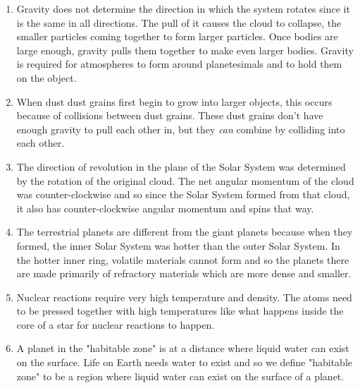 \documentclass[../hw2.tex]{subfiles}
\begin{document}

    \begin{enumerate}
        \item {} Gravity does not determine the direction in which the system rotates since it is the same in all directions. The pull of it causes the cloud to collapse, the smaller particles coming together to form larger particles. Once bodies are large enough, gravity pulls them together to make even larger bodies. Gravity is required for atmospheres to form around planetesimals and to hold them on the object.
        \item {} When dust dust grains first begin to grow into larger objects, this occurs because of collisions between dust grains. These dust grains don't have enough gravity to pull each other in, but they \emph{can} combine by colliding into each other.
        \item {} The direction of revolution in the plane of the Solar System was determined by the rotation of the original cloud. The net angular momentum of the cloud was counter-clockwise and so since the Solar System formed from that cloud, it also has counter-clockwise angular momentum and spins that way.
        \item {} The terrestrial planets are different from the giant planets because when they formed, the inner Solar System was hotter than the outer Solar System. In the hotter inner ring, volatile materials cannot form and so the planets there are made primarily of refractory materials which are more dense and smaller. 
        \item {} Nuclear reactions require very high temperature and density. The atoms need to be pressed together with high temperatures like what happens inside the core of a star for nuclear reactions to happen.
        \item {} A planet in the "habitable zone" is at a distance where liquid water can exist on the surface. Life on Earth needs water to exist and so we define "habitable zone" to be a region where liquid water can exist on the surface of a planet.
    \end{enumerate}
    
\end{document}
